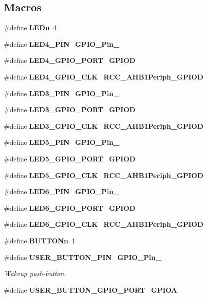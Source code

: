 \subsection*{Macros}
\begin{DoxyCompactItemize}
\item 
\#define \textbf{ L\+E\+Dn}~4
\item 
\#define \textbf{ L\+E\+D4\+\_\+\+P\+IN}~\textbf{ G\+P\+I\+O\+\_\+\+Pin\+\_}
\item 
\#define \textbf{ L\+E\+D4\+\_\+\+G\+P\+I\+O\+\_\+\+P\+O\+RT}~\textbf{ G\+P\+I\+OD}
\item 
\#define \textbf{ L\+E\+D4\+\_\+\+G\+P\+I\+O\+\_\+\+C\+LK}~\textbf{ R\+C\+C\+\_\+\+A\+H\+B1\+Periph\+\_\+\+G\+P\+I\+OD}
\item 
\#define \textbf{ L\+E\+D3\+\_\+\+P\+IN}~\textbf{ G\+P\+I\+O\+\_\+\+Pin\+\_}
\item 
\#define \textbf{ L\+E\+D3\+\_\+\+G\+P\+I\+O\+\_\+\+P\+O\+RT}~\textbf{ G\+P\+I\+OD}
\item 
\#define \textbf{ L\+E\+D3\+\_\+\+G\+P\+I\+O\+\_\+\+C\+LK}~\textbf{ R\+C\+C\+\_\+\+A\+H\+B1\+Periph\+\_\+\+G\+P\+I\+OD}
\item 
\#define \textbf{ L\+E\+D5\+\_\+\+P\+IN}~\textbf{ G\+P\+I\+O\+\_\+\+Pin\+\_}
\item 
\#define \textbf{ L\+E\+D5\+\_\+\+G\+P\+I\+O\+\_\+\+P\+O\+RT}~\textbf{ G\+P\+I\+OD}
\item 
\#define \textbf{ L\+E\+D5\+\_\+\+G\+P\+I\+O\+\_\+\+C\+LK}~\textbf{ R\+C\+C\+\_\+\+A\+H\+B1\+Periph\+\_\+\+G\+P\+I\+OD}
\item 
\#define \textbf{ L\+E\+D6\+\_\+\+P\+IN}~\textbf{ G\+P\+I\+O\+\_\+\+Pin\+\_}
\item 
\#define \textbf{ L\+E\+D6\+\_\+\+G\+P\+I\+O\+\_\+\+P\+O\+RT}~\textbf{ G\+P\+I\+OD}
\item 
\#define \textbf{ L\+E\+D6\+\_\+\+G\+P\+I\+O\+\_\+\+C\+LK}~\textbf{ R\+C\+C\+\_\+\+A\+H\+B1\+Periph\+\_\+\+G\+P\+I\+OD}
\item 
\#define \textbf{ B\+U\+T\+T\+O\+Nn}~1
\item 
\#define \textbf{ U\+S\+E\+R\+\_\+\+B\+U\+T\+T\+O\+N\+\_\+\+P\+IN}~\textbf{ G\+P\+I\+O\+\_\+\+Pin\+\_}
\begin{DoxyCompactList}\small\item\em Wakeup push-\/button. \end{DoxyCompactList}\item 
\#define \textbf{ U\+S\+E\+R\+\_\+\+B\+U\+T\+T\+O\+N\+\_\+\+G\+P\+I\+O\+\_\+\+P\+O\+RT}~\textbf{ G\+P\+I\+OA}

\end{DoxyCompactItemize}
